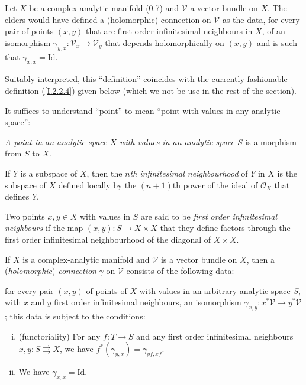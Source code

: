 \documentclass{report}
\theoremstyle{plain}
\theoremstyle{definition}
\newenvironment{env}[1]
    {\renewcommand\theinnercustomenv{#1}\innercustomenv}
    {\endinnercustomenv}
\newcommand{\sh}{\mathscr}
\newcommand{\id}{\mathrm{Id}}
\newcommand{\oldpage}[1]{\marginpar{\footnotesize$\Big\vert$ \textit{p.~#1}}}
\begin{document}
\begin{env}{2.2}
\label{I.2.2}
  Let $X$ be a complex-analytic manifold \hyperref[0.7]{(0.7)} and $\sh{V}$ a vector bundle on $X$.
  The elders would have defined a (holomorphic) connection on $\sh{V}$ as the data, for every pair of points $(x,y)$ that are first order infinitesimal neighbours in $X$, of an isomorphism $\gamma_{y,x}\colon\sh{V}_x\to\sh{V}_y$ that depends holomorphically on $(x,y)$ and is such that $\gamma_{x,x}=\id$.

  Suitably interpreted, this ``definition'' coincides with the currently fashionable definition (\cref{I.2.2.4}) given below (which we not be use in the rest of the section).

  It suffices to understand ``point'' to mean ``point with values in any analytic space'':

\oldpage{6}
  \begin{env}{2.2.1}
  \label{I.2.2.1}
    \emph{A point in an analytic space $X$ with values in an analytic space $S$} is a morphism from $S$ to $X$.
  \end{env}

  \begin{env}{2.2.2}
  \label{I.2.2.2}
    If $Y$ is a subspace of $X$, then the \emph{$n$th infinitesimal neighbourhood} of $Y$ in $X$ is the subspace of $X$ defined locally by the $(n+1)$th power of the ideal of $\sh{O}_X$ that defines $Y$.
  \end{env}

  \begin{env}{2.2.3}
  \label{I.2.2.3}
    Two points $x,y\in X$ with values in $S$ are said to be \emph{first order infinitesimal neighbours} if the map $(x,y)\colon S\to X\times X$ that they define factors through the first order infinitesimal neighbourhood of the diagonal of $X\times X$.
  \end{env}

  \begin{env}{2.2.4}
  \label{I.2.2.4}
    If $X$ is a complex-analytic manifold and $\sh{V}$ is a vector bundle on $X$, then a (\emph{holomorphic}) \emph{connection} $\gamma$ on $\sh{V}$ consists of the following data:

    for every pair $(x,y)$ of points of $X$ with values in an arbitrary analytic space $S$, with $x$ and $y$ first order infinitesimal neighbours, an isomorphism $\gamma_{x,y}\colon x^*\sh{V}\to y^*\sh{V}$;
    this data is subject to the conditions:
    \begin{enumerate}[(i)]
      \item (functoriality) For any $f\colon T\to S$ and any first order infinitesimal neighbours $x,y\colon S\rightrightarrows X$, we have $f^*(\gamma_{y,x})=\gamma_{yf,xf}$.
      \item We have $\gamma_{x,x}=\id$.
    \end{enumerate}
  \end{env}
\end{env}
\end{document}
